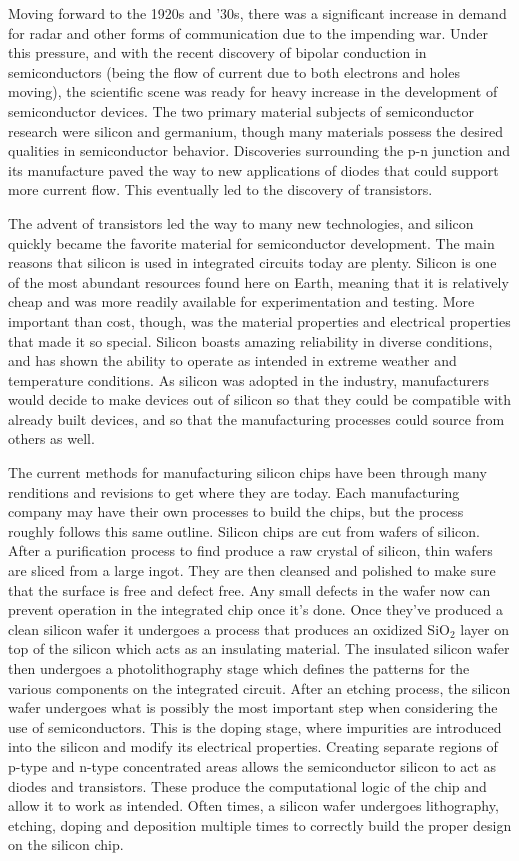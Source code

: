 \documentclass[12pt]{article}
\begin{document}
\begin{flushleft}
Moving forward to the 1920s and '30s, there was a significant
increase in demand for radar and other forms of communication
due to the impending war. Under this pressure, and
with the recent discovery of bipolar conduction in
semiconductors (being the flow of current due to both
electrons and holes moving), the scientific scene was
ready for heavy increase in the development of semiconductor
devices. The two primary material subjects of semiconductor
research were silicon and germanium, though many materials
possess the desired qualities in semiconductor behavior.
Discoveries surrounding the p-n junction and its manufacture
paved the way to new applications of diodes that could
support more current flow. This eventually led to the
discovery of transistors.

The advent of transistors led the way to many new technologies,
and silicon quickly became the favorite material for
semiconductor development. The main reasons that silicon
is used in integrated circuits today are plenty. Silicon
is one of the most abundant resources found here on
Earth, meaning that it is relatively cheap and was
more readily available for experimentation and testing.
More important than cost, though, was the material
properties and electrical properties that made it so
special. Silicon boasts amazing reliability in diverse
conditions, and has shown the ability to operate as
intended in extreme weather and temperature conditions.
As silicon was adopted in the industry, manufacturers
would decide to make devices out of silicon so that
they could be compatible with already built devices,
and so that the manufacturing processes could source
from others as well.

The current methods for manufacturing silicon chips
have been through many renditions and revisions to get
where they are today. Each manufacturing company may have
their own processes to build the chips, but the process
roughly follows this same outline. Silicon chips are
cut from wafers of silicon. After a purification process
to find produce a raw crystal of silicon, thin wafers
are sliced from a large ingot. They are then cleansed
and polished to make sure that the surface is free
and defect free. Any small defects in the wafer now
can prevent operation in the integrated chip once it's
done. Once they've produced a clean silicon wafer it
undergoes a process that produces an oxidized SiO$_2$
layer on top of the silicon which acts as an insulating
material. The insulated silicon wafer then undergoes
a photolithography stage which defines the patterns
for the various components on the integrated circuit.
After an etching process, the silicon wafer undergoes
what is possibly the most important step when considering
the use of semiconductors. This is the doping stage, where
impurities are introduced into the silicon and modify its
electrical properties. Creating separate regions of p-type
and n-type concentrated areas allows the semiconductor
silicon to act as diodes and transistors. These produce
the computational logic of the chip and allow it to
work as intended. Often times, a silicon wafer undergoes
lithography, etching, doping and deposition multiple
times to correctly build the proper design on the 
silicon chip.


\end{flushleft}
\end{document}
